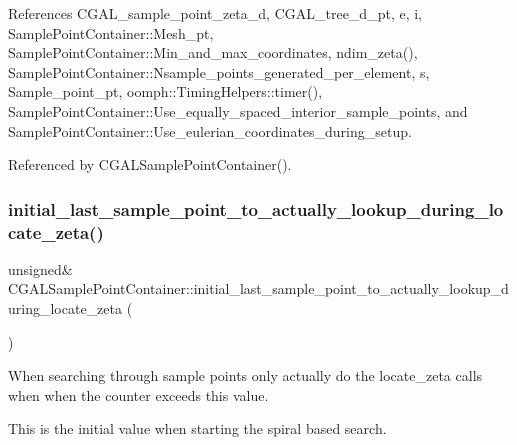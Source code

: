 References C\+G\+A\+L\+\_\+sample\+\_\+point\+\_\+zeta\+\_\+d, C\+G\+A\+L\+\_\+tree\+\_\+d\+\_\+pt, e, i, Sample\+Point\+Container\+::\+Mesh\+\_\+pt, Sample\+Point\+Container\+::\+Min\+\_\+and\+\_\+max\+\_\+coordinates, ndim\+\_\+zeta(), Sample\+Point\+Container\+::\+Nsample\+\_\+points\+\_\+generated\+\_\+per\+\_\+element, s, Sample\+\_\+point\+\_\+pt, oomph\+::\+Timing\+Helpers\+::timer(), Sample\+Point\+Container\+::\+Use\+\_\+equally\+\_\+spaced\+\_\+interior\+\_\+sample\+\_\+points, and Sample\+Point\+Container\+::\+Use\+\_\+eulerian\+\_\+coordinates\+\_\+during\+\_\+setup.



Referenced by C\+G\+A\+L\+Sample\+Point\+Container().

\mbox{\label{classCGALSamplePointContainer_a6e348c02398a20868849874f793792a2}} 
\subsubsection{\texorpdfstring{initial\+\_\+last\+\_\+sample\+\_\+point\+\_\+to\+\_\+actually\+\_\+lookup\+\_\+during\+\_\+locate\+\_\+zeta()}{initial\_last\_sample\_point\_to\_actually\_lookup\_during\_locate\_zeta()}}
{\footnotesize\ttfamily unsigned\& C\+G\+A\+L\+Sample\+Point\+Container\+::initial\+\_\+last\+\_\+sample\+\_\+point\+\_\+to\+\_\+actually\+\_\+lookup\+\_\+during\+\_\+locate\+\_\+zeta (\begin{DoxyParamCaption}{ }\end{DoxyParamCaption})\hspace{0.3cm}{\ttfamily [inline]}}



When searching through sample points only actually do the locate\+\_\+zeta calls when when the counter exceeds this value. 

This is the initial value when starting the spiral based search. 

